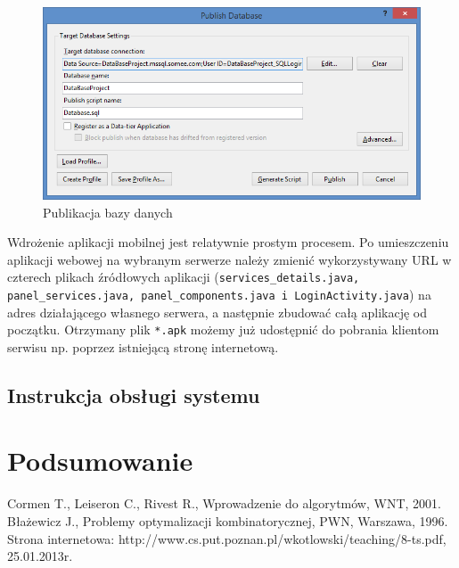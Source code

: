 \documentclass[a4paper,11pt]{article}
\begin{document}
\begin{figure}[h!]
	\centering
	\includegraphics[width=\textwidth,height=0.6\textheight]{db4.png}
	\caption{Publikacja bazy danych}
\end{figure}

Wdrożenie aplikacji mobilnej jest relatywnie prostym procesem. Po umieszczeniu aplikacji webowej na wybranym serwerze należy zmienić wykorzystywany URL w czterech plikach źródłowych aplikacji (\texttt{services\_details.java, panel\_services.java, panel\_components.java i LoginActivity.java}) na adres działającego własnego serwera, a następnie zbudować całą aplikację od początku. Otrzymany plik \texttt{*.apk} możemy już udostępnić do pobrania klientom serwisu np. poprzez istniejącą stronę internetową.
\subsection{Instrukcja obsługi systemu}
\section{Podsumowanie}

\newpage
\listoffigures
{} 
\newpage
\listoftables
{}



\newpage
{}
\begin{thebibliography}{9}
 Cormen T., Leiseron C., Rivest R., Wprowadzenie do algorytmów, WNT, 2001. 
 Błażewicz J., Problemy optymalizacji kombinatorycznej, PWN, Warszawa, 1996.
 Strona internetowa: http://www.cs.put.poznan.pl/wkotlowski/teaching/8-ts.pdf, 25.01.2013r.
\end{thebibliography}
\end{document}
